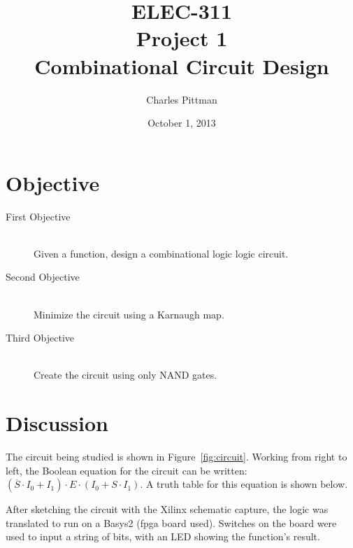\documentclass{article}
\author{Charles Pittman}
\title{ELEC-311\\ Project 1\\ Combinational Circuit Design}
\date{October 1, 2013}
\begin{document}
\maketitle %

\pagebreak


\renewcommand{\labelenumi}{\alph{enumi}.}

\section{Objective}
\label{sec:objective}

 \begin{description}
 \item[First Objective] \hfill \\
   Given a function, design a combinational logic logic circuit.
 \item[Second Objective] \hfill \\
   Minimize the circuit using a Karnaugh map.
 \item[Third Objective] \hfill \\
   Create the circuit using only NAND gates.
 \end{description}

\section{Discussion}
\label{sec:procedure}

The circuit being studied is shown in Figure~\ref{fig:circuit}.
Working from right to left, the Boolean equation for the circuit can
be written: $(\overline{S} \cdot I_0 + I_1) \cdot E \cdot (I_0 + S
\cdot I_1)$.  A truth table for this equation is shown below.

After sketching the circuit with the Xilinx schematic capture, the
logic was translated to run on a Basys2 (\gls{fpga} board used).
Switches on the board were used to input a string of bits, with an LED
showing the function's result.

\end{document}
